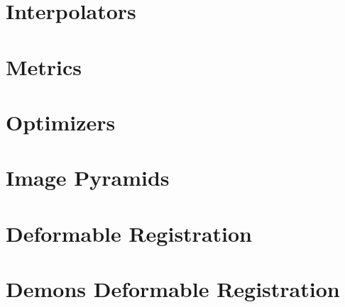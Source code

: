 \section{Interpolators}
\label{sec:Interpolators}


\section{Metrics}
\label{sec:Metrics}


\section{Optimizers}
\label{sec:Optimizers}


\section{Image Pyramids}
\label{sec:ImagePyramids}



\section{Deformable Registration}
\label{sec:DeformableRegistration}


\section{Demons Deformable Registration}
\label{sec:DemonsDeformableRegistration}




